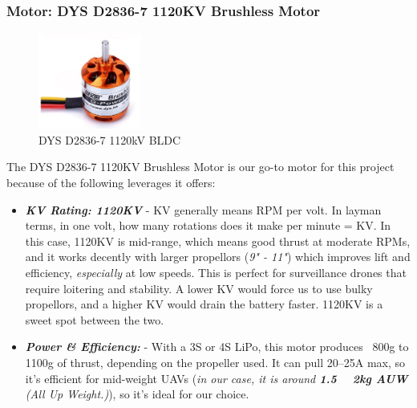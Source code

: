 \documentclass[12pt]{report}
\begin{document}
      \subsubsection{\large Motor: DYS D2836-7 1120KV Brushless Motor} 
      \begin{figure}
        \includegraphics[width=0.3\textwidth]{bldc.png}
        \caption{DYS D2836-7 1120kV BLDC}
        \label{fig:bldc1120}
      \end{figure}
      The DYS D2836-7 1120KV Brushless Motor is our go-to motor for this project because of the following leverages it offers:
        
      \begin{itemize}
        \item \textbf{\textit{KV Rating: 1120KV}} - KV generally means RPM per volt. In layman terms, in one volt, how many rotations does it make per minute = KV. In this case, 1120KV is mid-range, which means good thrust at moderate RPMs, and it works decently with larger propellors (\textit{9" - 11"}) which improves lift and efficiency, \textit{especially} at low speeds. This is perfect for surveillance drones that require loitering and stability. A lower KV would force us to use bulky propellors, and a higher KV would drain the battery faster. 1120KV is a sweet spot between the two.
        \item \textbf{\textit{Power \& Efficiency:}} - With a 3S or 4S LiPo, this motor produces ~800g to 1100g of thrust, depending on the propeller used. It can pull 20–25A max, so it's efficient for mid-weight UAVs (\textit{in our case, it is around \textbf{1.5 ~ 2kg AUW} (All Up Weight.)}), so it's ideal for our choice.
      \end{itemize}
      
\end{document}
